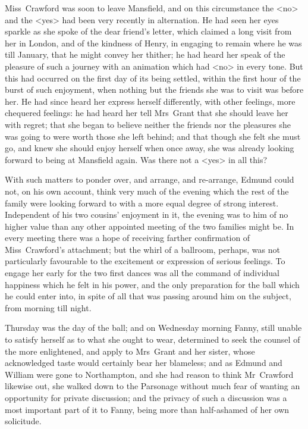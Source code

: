 Miss~Crawford was soon to leave Mansfield, and on this circumstance the <no> and the <yes> had been very recently in alternation. He had seen her eyes sparkle as she spoke of the dear friend's letter, which claimed a long visit from her in London, and of the kindness of Henry, in engaging to remain where he was till January, that he might convey her thither; he had heard her speak of the pleasure of such a journey with an animation which had <no> in every tone. But this had occurred on the first day of its being settled, within the first hour of the burst of such enjoyment, when nothing but the friends she was to visit was before her. He had since heard her express herself differently, with other feelings, more chequered feelings: he had heard her tell Mrs~Grant that she should leave her with regret; that she began to believe neither the friends nor the pleasures she was going to were worth those she left behind; and that though she felt she must go, and knew she should enjoy herself when once away, she was already looking forward to being at Mansfield again. Was there not a <yes> in all this?

With such matters to ponder over, and arrange, and re-arrange, Edmund could not, on his own account, think very much of the evening which the rest of the family were looking forward to with a more equal degree of strong interest. Independent of his two cousins' enjoyment in it, the evening was to him of no higher value than any other appointed meeting of the two families might be. In every meeting there was a hope of receiving farther confirmation of Miss~Crawford's attachment; but the whirl of a ballroom, perhaps, was not particularly favourable to the excitement or expression of serious feelings. To engage her early for the two first dances was all the command of individual happiness which he felt in his power, and the only preparation for the ball which he could enter into, in spite of all that was passing around him on the subject, from morning till night.

Thursday was the day of the ball; and on Wednesday morning Fanny, still unable to satisfy herself as to what she ought to wear, determined to seek the counsel of the more enlightened, and apply to Mrs~Grant and her sister, whose acknowledged taste would certainly bear her blameless; and as Edmund and William were gone to Northampton, and she had reason to think Mr~Crawford likewise out, she walked down to the Parsonage without much fear of wanting an opportunity for private discussion; and the privacy of such a discussion was a most important part of it to Fanny, being more than half-ashamed of her own solicitude.

